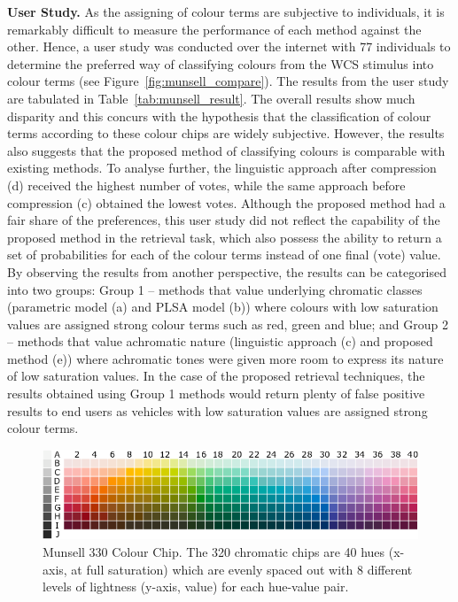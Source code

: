 \textbf{User Study.} As the assigning of colour terms are subjective to individuals, it is remarkably difficult to measure the performance of each method against the other. Hence, a user study was conducted over the internet with 77 individuals to determine the preferred way of classifying colours from the WCS stimulus into colour terms (see Figure~\ref{fig:munsell_compare}). The results from the user study are tabulated in Table~\ref{tab:munsell_result}.
The overall results show much disparity and this concurs with the hypothesis that the classification of colour terms according to these colour chips are widely subjective.
However, the results also suggests that the proposed method of classifying colours is comparable with existing methods.
To analyse further, the linguistic approach after compression (d) received the highest number of votes, while the same approach before compression (c) obtained the lowest votes.
Although the proposed method had a fair share of the preferences, this user study did not reflect the capability of the proposed method in the retrieval task, which also possess the ability to return a set of probabilities for each of the colour terms instead of one final (vote) value.
By observing the results from another perspective, the results can be categorised into two groups: Group 1 -- methods that value underlying chromatic classes (parametric model (a) and PLSA model (b)) where colours with low saturation values are assigned strong colour terms such as red, green and blue;
and Group 2 -- methods that value achromatic nature (linguistic approach (c) and proposed method (e)) where achromatic tones were given more room to express its nature of low saturation values.
In the case of the proposed retrieval techniques, the results obtained using Group 1 methods would return plenty of false positive results to end users as vehicles with low saturation values are assigned strong colour terms.

\begin{figure}[hbt!]\centering
\includegraphics[width=.9\textwidth]{image/analysis/munsell_o.png}
\caption{Munsell 330 Colour Chip. The 320 chromatic chips are 40 hues (x-axis, at full saturation) which are evenly spaced out with 8 different levels of lightness (y-axis, value) for each hue-value pair.}
\label{fig:munsell_ori330}
\end{figure}

